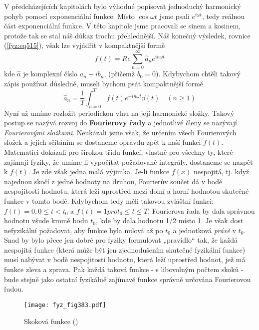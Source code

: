   V předcházejících kapitolách bylo výhodné popisovat jednoduchý harmonický pohyb pomocí 
  exponenciální funkce. Místo \(\cos\omega t\) jsme psali \(e^{i\omega t}\), tedy reálnou část 
  exponenciální funkce. V této kapitole jsme pracovali se sinem a kosinem, protože tak se stal náš 
  důkaz trochu přehlednější. Náš konečný výsledek, rovnice (\ref{fyz:eq515}), však lze vyjádřit v 
  kompaktnější formě
  \begin{equation}\label{fyz:eq517}
    f(t) = Re\sum_{n=0}^{\infty}\hat{a}_n e^{in\omega t}
  \end{equation}
  kde \(\hat{a}\) je komplexní číslo \(a_n - ib_n\), (přičemž \(b_0 = 0\)). Kdybychom chtěli takový 
  zápis používat důsledně, museli bychom psát
  kompaktnější formě
  \begin{equation}\label{fyz:eq518}
    \hat{a}_n = \dfrac{1}{T}\int_{n=0}^{T}f(t) e^{-in\omega t}\dd(t)\quad (n\geq1)
  \end{equation}
  Nyní už umíme rozložit periodickou vlnu na její harmonické složky. Takový postup se nazývá rozvoj 
  do \textbf{Fourierovy řady} a jednotlivé členy se nazývají \emph{Fourierovými složkami}. 
  Neukázali jsme však, že určením všech Fourierových složek a jejich sčítáním se dostaneme opravdu 
  zpět k naší funkci \(f(t)\). Matematici dokázali pro širokou třídu funkcí, vlastně pro všechny 
  ty, které zajímají fyziky, že umíme-li vypočítat požadované integrály, dostaneme se nazpět k 
  \(f(t)\). Je zde však jedna malá výjimka. Je-li funkce \(f(x)\) nespojitá, tj. když najednou 
  skočí z jedné hodnoty na druhou, Fourierův součet dá v bodě nespojitosti hodnotu, která leží 
  uprostřed mezi dolní a horní hodnotou skutečné funkce v tomto bodě. Kdybychom tedy měli takovou 
  zvláštní funkci: \(f(t) = 0, 0 \leq t<t_0\) a \(f(t) = 1 pro t_0 \leq t \leq T\), Fourierova řada 
  by dala správnou hodnotu všude kromě bodu \(t_0\), kde by dala hodnotu \num{1/2} místo \num{1}. 
  Je však dost nefyzikální požadovat, aby funkce byla nulová až po \(t_0\) a jednotková 
  \emph{právě} v \(t_0\).  Snad by bylo přece jen dobré pro fyziky formulovat „pravidlo“ tak, že 
  každá nespojitá funkce (která může být jen zjednodušením skutečné fyzikální funkce) musí nabývat 
  v bodě nespojitosti hodnotu, která leží uprostřed hodnot, jež má funkce zleva a zprava. Pak každá 
  taková funkce - s libovolným počtem skoků - bude stejně jako ostatní fyzikálně zajímavé funkce 
  správně určována Fourierovou řadou.
    
  \begin{figure}[ht!] %
    \centering
    \texttt{[image: fyz\_fig383.pdf]}
    \caption{Skoková funkce
             (\cite[s.~680]{Feynman01})}
    \label{fyz:fig383}
  \end{figure}
  
